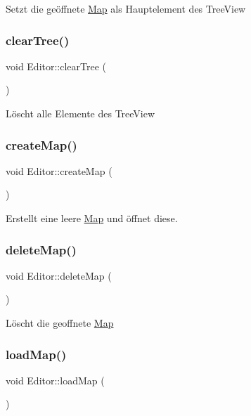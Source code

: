 Setzt die geöffnete \mbox{\hyperlink{class_map}{Map}} als Hauptelement des Tree\+View \mbox{\label{class_editor_a35b08c0c5641203323d8865afe4a2959}} 
\subsubsection{\texorpdfstring{clear\+Tree()}{clearTree()}}
{\footnotesize\ttfamily void Editor\+::clear\+Tree (\begin{DoxyParamCaption}{ }\end{DoxyParamCaption})}

Löscht alle Elemente des Tree\+View \mbox{\label{class_editor_a1641e805c7e3d2441c8658ddc9f04ed1}} 
\subsubsection{\texorpdfstring{create\+Map()}{createMap()}}
{\footnotesize\ttfamily void Editor\+::create\+Map (\begin{DoxyParamCaption}{ }\end{DoxyParamCaption})}

Erstellt eine leere \mbox{\hyperlink{class_map}{Map}} und öffnet diese. \mbox{\label{class_editor_a5e4c7dcadb49adcdece3235a92a5fa5c}} 
\subsubsection{\texorpdfstring{delete\+Map()}{deleteMap()}}
{\footnotesize\ttfamily void Editor\+::delete\+Map (\begin{DoxyParamCaption}{ }\end{DoxyParamCaption})}

Löscht die geoffnete \mbox{\hyperlink{class_map}{Map}} \mbox{\label{class_editor_a392c4c8e63399e824bbac9b669287602}} 
\subsubsection{\texorpdfstring{load\+Map()}{loadMap()}}
{\footnotesize\ttfamily void Editor\+::load\+Map (\begin{DoxyParamCaption}{ }\end{DoxyParamCaption})}

